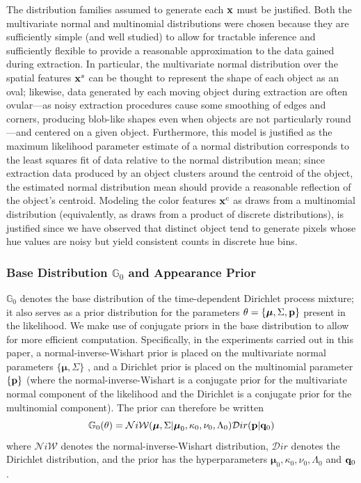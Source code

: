 \documentclass[smallcondensed, final]{svjour3}
\begin{document}
The distribution families assumed to generate each $\bold{x}$ must be justified. Both the multivariate normal and multinomial distributions were chosen because they are sufficiently simple (and well studied) to allow for tractable inference and sufficiently flexible to provide a reasonable approximation to the data gained during extraction. In particular, the multivariate normal distribution over the spatial features $\bold{x}^{s}$ can be thought to represent the shape of each object as an oval; likewise, data generated by each moving object during extraction are often ovular---as noisy extraction procedures cause some smoothing of edges and corners, producing blob-like shapes even when objects are not particularly round---and centered on a given object.
Furthermore, this model is justified as the maximum likelihood parameter estimate of a normal distribution corresponds to the least squares fit of data relative to the normal distribution mean; since extraction data produced by an object clusters around the centroid of the object, the estimated normal distribution mean should provide a reasonable reflection of the object's centroid.
Modeling the color features $\bold{x}^{c}$ as draws from a multinomial distribution (equivalently, as draws from a product of discrete distributions), is justified since we have observed that distinct object tend to generate pixels whose hue values are noisy but yield consistent counts in discrete hue bins.






\subsubsection{Base Distribution $\mathbb{G}_{0}$ and Appearance Prior}

$\mathbb{G}_{0}$ denotes the base distribution of the time-dependent Dirichlet process mixture; it also serves as a prior distribution for the parameters $\theta = \{ \boldsymbol{\mu}, \Sigma, \bold{p} \}$ present in the likelihood. We make use of conjugate priors in the base distribution to allow for more efficient computation. Specifically, in the experiments carried out in this paper, a normal-inverse-Wishart prior is placed on the multivariate normal parameters $\{ \boldsymbol{\mu}, \Sigma \}$ , and a Dirichlet prior is placed on the multinomial parameter $ \{  \bold{p}  \} $ (where the normal-inverse-Wishart is a conjugate prior for the multivariate normal component of the likelihood and the Dirichlet is a conjugate prior for the multinomial component). The prior can therefore be written
\begin{equation}
\label{basedistro}
\mathbb{G}_{0}(\theta) = \mathcal{N}i\mathcal{W}(\boldsymbol{\mu}, \Sigma | \boldsymbol{\mu}_{0}, \kappa_{0}, \nu_{0}, \Lambda_{0})  \mathcal{D}ir( \bold{p} | \bold{q}_{0})
\end{equation}
where $\mathcal{N}i\mathcal{W}$ denotes the normal-inverse-Wishart distribution, $\mathcal{D}ir$ denotes the Dirichlet distribution, and the prior has the hyperparameters $\boldsymbol{\mu}_{0}, \kappa_{0}, \nu_{0}, \Lambda_{0}$ and $\bold{q}_{0}$.
\end{document}
